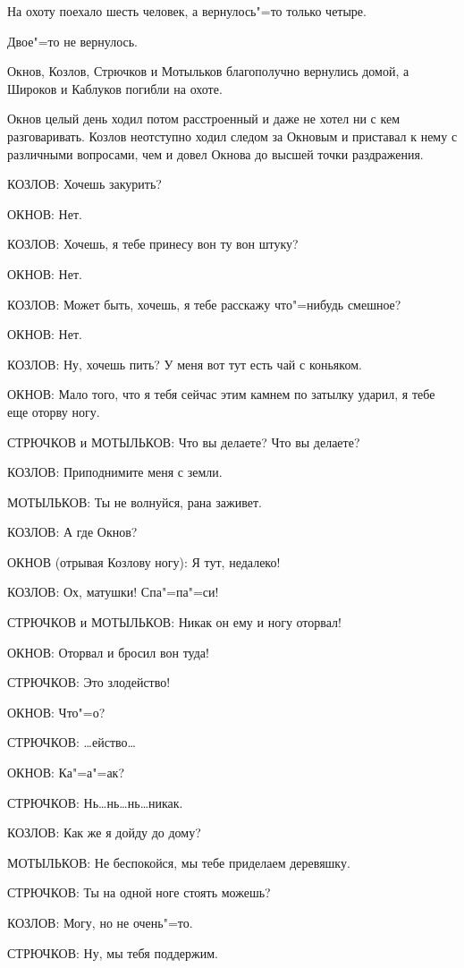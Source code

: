 На охоту поехало шесть человек, а вернулось"=то только четыре.

Двое"=то не вернулось.

Окнов, Козлов, Стрючков и Мотыльков благополучно вернулись домой, а Широков и
Каблуков погибли на охоте.

Окнов целый день ходил потом расстроенный и даже не хотел ни с кем
разговаривать. Козлов неотступно ходил следом за Окновым и приставал к нему с
различными вопросами, чем и довел Окнова до высшей точки раздражения.

КОЗЛОВ: Хочешь закурить?

ОКНОВ: Нет.

КОЗЛОВ: Хочешь, я тебе принесу вон ту вон штуку?

ОКНОВ: Нет.

КОЗЛОВ: Может быть, хочешь, я тебе расскажу что"=нибудь смешное?

ОКНОВ: Нет.

КОЗЛОВ: Ну, хочешь пить? У меня вот тут есть чай с коньяком.

ОКНОВ: Мало того, что я тебя сейчас этим камнем по затылку ударил, я тебе еще
оторву ногу.

СТРЮЧКОВ и МОТЫЛЬКОВ: Что вы делаете? Что вы делаете?

КОЗЛОВ: Приподнимите меня с земли.

МОТЫЛЬКОВ: Ты не волнуйся, рана заживет.

КОЗЛОВ: А где Окнов?

ОКНОВ (отрывая Козлову ногу): Я тут, недалеко!

КОЗЛОВ: Ох, матушки! Спа"=па"=си!

СТРЮЧКОВ и МОТЫЛЬКОВ: Никак он ему и ногу оторвал!

ОКНОВ: Оторвал и бросил вон туда!

СТРЮЧКОВ: Это злодейство!

ОКНОВ: Что"=о?

СТРЮЧКОВ: \dots ейство\dots

ОКНОВ: Ка"=а"=ак?

СТРЮЧКОВ: Нь\dots нь\dots нь\dots никак.

КОЗЛОВ: Как же я дойду до дому?

МОТЫЛЬКОВ: Не беспокойся, мы тебе приделаем деревяшку.

СТРЮЧКОВ: Ты на одной ноге стоять можешь?

КОЗЛОВ: Могу, но не очень"=то.

СТРЮЧКОВ: Ну, мы тебя поддержим.

